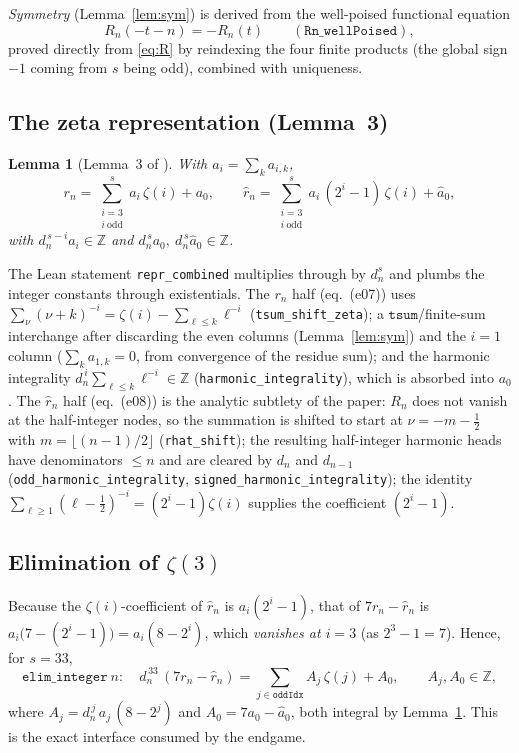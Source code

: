 \documentclass[11pt]{article}
\newtheorem{lemma}[theorem]{Lemma}
\theoremstyle{definition}
\newcommand{\Z}{\mathbb{Z}}
\newcommand{\code}[1]{\texttt{#1}}
\newcommand{\Rn}{R_n}
\begin{document}
\emph{Symmetry} (Lemma~\ref{lem:sym}) is derived from the well-poised
functional equation
\[
  \Rn(-t-n)=-\Rn(t)\qquad(\code{Rn\_wellPoised}),
\]
proved directly from \eqref{eq:R} by reindexing the four finite products (the
global sign $-1$ coming from $s$ being odd), combined with uniqueness.

\subsection{The zeta representation (Lemma~3)}

\begin{lemma}[Lemma~3 of \cite{Zudilin2018}]\label{lem:l3}
With $a_i=\sum_k a_{i,k}$,
\[
  r_n=\sum_{\substack{i=3\\ i\ \mathrm{odd}}}^{s} a_i\,\zeta(i)+a_0,
  \qquad
  \hat r_n=\sum_{\substack{i=3\\ i\ \mathrm{odd}}}^{s}
     a_i\,(2^{i}-1)\,\zeta(i)+\hat a_0,
\]
with $d_n^{\,s-i}a_i\in\Z$ and $d_n^{\,s}a_0,\ d_n^{\,s}\hat a_0\in\Z$.
\end{lemma}

The Lean statement \code{repr\_combined} multiplies through by $d_n^{s}$ and
plumbs the integer constants through existentials. The $r_n$ half (eq.~(e07))
uses $\sum_{\nu}(\nu+k)^{-i}=\zeta(i)-\sum_{\ell\le k}\ell^{-i}$
(\code{tsum\_shift\_zeta}); a $\code{tsum}$/finite-sum interchange after
discarding the even columns (Lemma~\ref{lem:sym}) and the $i=1$ column
($\sum_k a_{1,k}=0$, from convergence of the residue sum); and the harmonic
integrality $d_n^{\,i}\sum_{\ell\le k}\ell^{-i}\in\Z$
(\code{harmonic\_integrality}), which is absorbed into $a_0$. The $\hat r_n$
half (eq.~(e08)) is the analytic subtlety of the paper: $\Rn$ does not vanish
at the half-integer nodes, so the summation is shifted to start at
$\nu=-m-\tfrac12$ with $m=\lfloor(n-1)/2\rfloor$ (\code{rhat\_shift}); the
resulting half-integer harmonic heads have denominators $\le n$ and are cleared
by $d_n$ and $d_{n-1}$ (\code{odd\_harmonic\_integrality},
\code{signed\_harmonic\_integrality}); the identity
$\sum_{\ell\ge1}(\ell-\tfrac12)^{-i}=(2^i-1)\zeta(i)$ supplies the coefficient
$(2^i-1)$.

\subsection{Elimination of $\zeta(3)$}

Because the $\zeta(i)$-coefficient of $\hat r_n$ is $a_i(2^i-1)$, that of
$7r_n-\hat r_n$ is $a_i\bigl(7-(2^i-1)\bigr)=a_i(8-2^i)$, which
\emph{vanishes at $i=3$} (as $2^3-1=7$). Hence, for $s=33$,
\begin{equation}\label{eq:elim}
  \code{elim\_integer}\ n:\quad
  d_n^{\,33}\,(7r_n-\hat r_n)
    =\sum_{j\in\code{oddIdx}} A_j\,\zeta(j)+A_0,\qquad A_j,A_0\in\Z,
\end{equation}
where $A_j=d_n^{\,j}\,a_j\,(8-2^{j})$ and $A_0=7a_0-\hat a_0$, both integral by
Lemma~\ref{lem:l3}. This is the exact interface consumed by the endgame.
\end{document}
